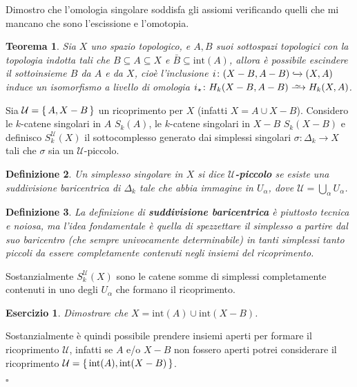 \documentclass[10pt, twoside=false, x11names]{scrbook}
\newtheorem{theorem}{Teorema}[section]
\newtheorem{definition}[theorem]{Definizione}
\newcounter{exercises}
\newtheorem{exercise}[exercises]{Esercizio}
\newenvironment{proof}{{\textbf{Dimostrazione}:}}{\hfill $\square$}
\newcommand{\homoto}{\xrightarrow{\,\smash{\raisebox{-0.65ex}{\ensuremath{\scriptstyle\sim}}}\,}}
\newcommand{\incl}{\xhookrightarrow{}}
\let\setminus-
\begin{document}
Dimostro che l'omologia singolare soddisfa gli assiomi verificando quelli
che mi mancano che sono l'escissione e l'omotopia.

\begin{theorem}
  Sia $ X $ uno spazio topologico, e $ A, B $ suoi sottospazi topologici
  con la topologia indotta tali che $ B \subseteq A \subseteq X $ e $ \bar{B} \subseteq \mathrm{int}(A) $,
  allora è possibile escindere il sottoinsieme $ B $ da $ A $ e da $ X $, cioè
  l'inclusione $ i \colon (X \setminus B, A \setminus B) \incl (X,A) $ induce un isomorfismo a livello
  di omologia $ i_\star \colon H_k(X \setminus B, A \setminus B) \homoto H_k(X,A) $.
\end{theorem}
\begin{proof}
  Sia $ \mathcal{U} = \set{A, X \setminus B} $ un ricoprimento per $ X $ (infatti
  $ X = A \cup X \setminus B $). Considero le $ k $-catene singolari in $ A $ $ S_k(A) $,
  le $ k $-catene singolari in $ X \setminus B $ $ S_k(X \setminus B) $ e definisco
  $ S_k^\mathcal{U}(X) $ il sottocomplesso generato dai simplessi singolari
  $ \sigma \colon \Delta_k \to X $ tali che $ \sigma $ sia un $ \mathcal{U} $-piccolo.

  \begin{definition}
    Un simplesso singolare in $ X $ si dice
    \textbf{$ \mathcal{U} $-piccolo} se esiste
    una suddivisione baricentrica di $ \Delta_k $ tale che abbia immagine in
    $ U_\alpha $, dove $ \mathcal{U} = \bigcup_\alpha U_\alpha $.
  \end{definition}

  \begin{definition}
    La definizione di \textbf{suddivisione baricentrica} è piuttosto tecnica e noiosa, ma l'idea fondamentale è
    quella di spezzettare il simplesso a partire dal suo baricentro (che sempre
    univocamente determinabile) in tanti simplessi tanto piccoli da essere
    completamente contenuti negli insiemi del ricoprimento.
  \end{definition}

  Sostanzialmente $ S_k^\mathcal{U}(X) $ sono le catene somme di simplessi
  completamente contenuti in uno degli $ U_\alpha $ che formano il ricoprimento.

  \begin{exercise}
    Dimostrare che $ X = \mathrm{int}(A) \cup \mathrm{int}(X \setminus B) $.
  \end{exercise}
  Sostanzialmente è quindi possibile prendere insiemi aperti per formare il
  ricoprimento $ \mathcal{U} $, infatti se $ A $ e/o $ X \setminus B $ non fossero
  aperti potrei considerare il ricoprimento
  $ \mathcal{U} = \set{ \mathrm{int}(A), \mathrm{int}(X \setminus B)} $.


\end{proof}
\end{document}
